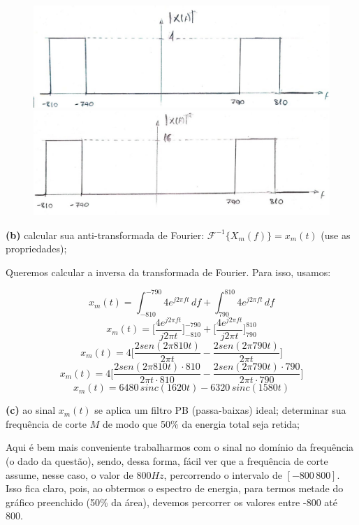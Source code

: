 \documentclass[10pt, a4paper]{article}
\begin{document}
\begin{figure}[h]
    \begin{minipage}[!]{0.50\linewidth}
        \includegraphics[scale=0.27]{plot3a2.jpeg}
    \end{minipage}
    \begin{minipage}[!]{0.48\linewidth}
        \includegraphics[scale=0.27]{plot3a1.jpeg}
    \end{minipage}
\end{figure}

{\textbf{(b)}} calcular sua anti-transformada de Fourier: $\mathcal{F}^{-1} \{X_{m}(f)\} = x_{m}(t)$ (use as propriedades);

Queremos calcular a inversa da transformada de Fourier. Para isso, usamos:

\[x_{m}(t) = \int_{-810}^{-790} 4e^{j2\pi ft}\,df + \int_{790}^{810} 4e^{j2\pi ft}\, df\]
\[x_{m}(t) = \biggl[\frac{4e^{j2\pi ft}}{j2\pi t}\biggr]_{-810}^{-790} + \biggl[\frac{4e^{j2\pi ft}}{j2\pi t}\biggr]_{790}^{810}\]
\[x_{m}(t) = 4\biggl[\frac{2sen(2\pi 810t)}{2\pi t} - \frac{2sen(2\pi 790t)}{2\pi t}\biggr]\]
\[x_{m}(t) = 4\biggl[\frac{2sen(2\pi 810t) \cdot 810}{2\pi t \cdot 810} - \frac{2sen(2\pi 790t) \cdot 790}{2\pi t \cdot 790}\biggr]\]
\[x_{m}(t) = 6480\,sinc(1620t) - 6320\,sinc(1580t)\]

{\textbf{(c)}} ao sinal $x_{m}(t)$ se aplica um filtro PB (passa-baixas) ideal; determinar sua frequência de corte $M$ de modo que 50\% da energia total seja retida;

Aqui é bem mais conveniente trabalharmos com o sinal no domínio da frequência (o dado da questão), sendo, dessa forma, fácil ver que a frequência de corte assume, nesse caso, o valor de $800Hz$, percorrendo o intervalo de $[-800\, 800]$. Isso fica claro, pois, ao obtermos o espectro de energia, para termos metade do gráfico preenchido (50\% da área), devemos percorrer os valores entre -800 até 800.
\end{document}
